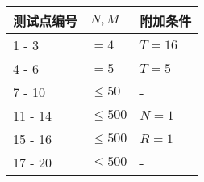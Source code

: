 \documentclass[UTF8, 11pt, a4paper]{article}
\begin{document}
\begin{table}[h]\centering
\begin{tabularx}{0.85 \textwidth}{X|X|X} \hline
测试点编号 & $N, M$     & 附加条件 \\ \hline\hline
1 - 3      & $= 4$      & $T = 16$ \\ \hline
4 - 6      & $= 5$      & $T = 5$ \\ \hline
7 - 10     & $\leq 50$  & - \\ \hline
11 - 14    & $\leq 500$ & $N = 1$ \\ \hline
15 - 16    & $\leq 500$ & $R = 1$ \\ \hline
17 - 20    & $\leq 500$ & - \\ \hline
\end{tabularx}
\end{table}
\end{document}
